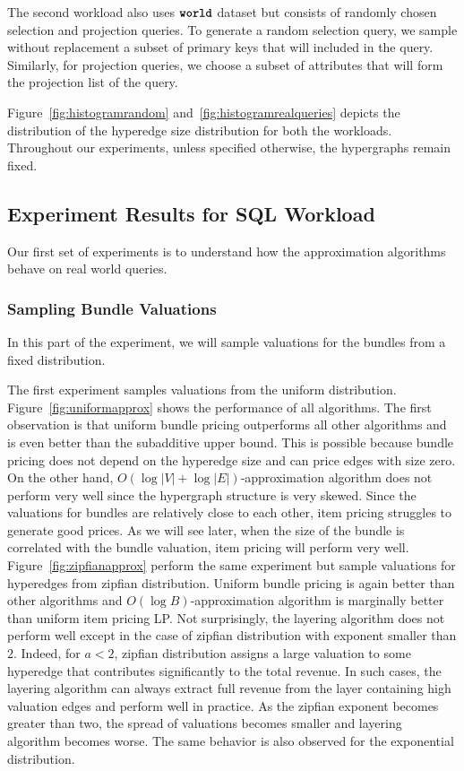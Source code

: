 The second workload also uses $\texttt{\bfseries world}$ dataset but consists of randomly chosen selection and projection queries. To generate a random selection query, we  sample without replacement a subset of primary keys that will included in the query. Similarly, for projection queries, we choose a subset of attributes that will form the projection list of the query.

Figure~\ref{fig:histogramrandom} and~\ref{fig:histogramrealqueries} depicts the distribution of the hyperedge size distribution for both the workloads. Throughout our experiments, unless specified otherwise, the hypergraphs remain fixed.


\subsection{Experiment Results for SQL Workload}

Our first set of experiments is to understand how the approximation algorithms behave on real world queries. 


\subsubsection{Sampling Bundle Valuations} 
In this part of the experiment, we will sample valuations for the bundles from a fixed distribution.

\smallskip
{} The first experiment samples valuations from the uniform distribution. Figure~\ref{fig:uniformapprox} shows the performance of all algorithms. The first observation is that uniform bundle pricing outperforms all other algorithms and is even better than the subadditive upper bound. This is possible because bundle pricing does not depend on the hyperedge size and can price edges with size zero. On the other hand, $O(\log |V|+\log |E|)$-approximation algorithm does not perform very well since the hypergraph structure is very skewed. Since the valuations for bundles are relatively close to each other, item pricing struggles to generate good prices. As we will see later, when the size of the bundle is correlated with the bundle valuation, item pricing will perform very well.  Figure~\ref{fig:zipfianapprox} perform the same experiment but sample valuations for hyperedges from zipfian distribution. Uniform bundle pricing is again better than other algorithms and $O(\log B)$-approximation algorithm is marginally better than uniform item pricing LP. Not surprisingly, the layering algorithm does not perform well except in the case of zipfian distribution with exponent smaller than $2$. Indeed, for $a < 2$, zipfian distribution assigns a large valuation to some hyperedge that contributes significantly to the total revenue. In such cases, the layering algorithm can always extract full revenue from the layer containing high valuation edges and perform well in practice. As the zipfian exponent becomes greater than two, the spread of valuations becomes smaller and layering algorithm becomes worse. The same behavior is also observed for the exponential distribution. 

